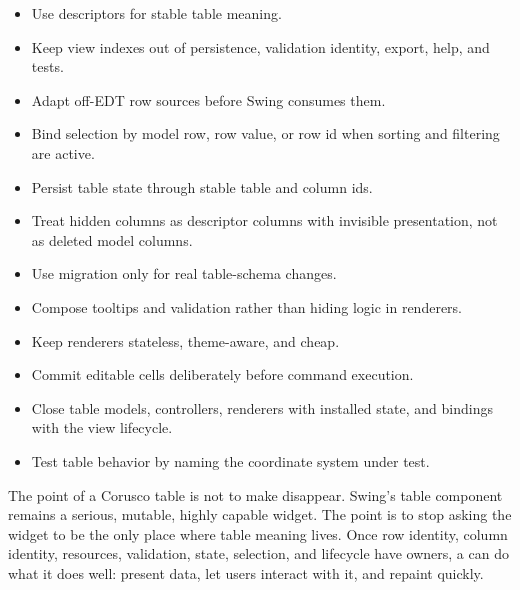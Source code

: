 \begin{itemize}
\item Use descriptors for stable table meaning.
\item Keep view indexes out of persistence, validation identity, export, help,
and tests.
\item Adapt off-EDT row sources before Swing consumes them.
\item Bind selection by model row, row value, or row id when sorting and
filtering are active.
\item Persist table state through stable table and column ids.
\item Treat hidden columns as descriptor columns with invisible presentation,
not as deleted model columns.
\item Use migration only for real table-schema changes.
\item Compose tooltips and validation rather than hiding logic in renderers.
\item Keep renderers stateless, theme-aware, and cheap.
\item Commit editable cells deliberately before command execution.
\item Close table models, controllers, renderers with installed state, and
bindings with the view lifecycle.
\item Test table behavior by naming the coordinate system under test.
\end{itemize}

The point of a Corusco table is not to make  disappear. Swing's
table component remains a serious, mutable, highly capable widget. The point is
to stop asking the widget to be the only place where table meaning lives. Once
row identity, column identity, resources, validation, state, selection, and
lifecycle have owners, a  can do what it does well: present data,
let users interact with it, and repaint quickly.
